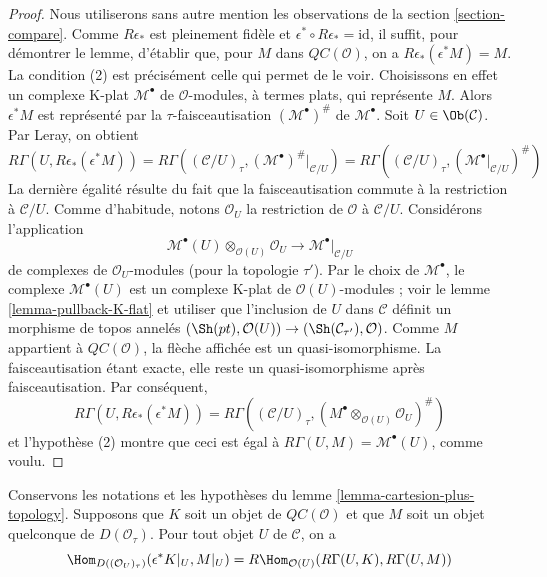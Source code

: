 \begin{proof}
Nous utiliserons sans autre mention les observations de la section
\ref{section-compare}. Comme $R\epsilon_*$ est pleinement fidèle et
$\epsilon^* \circ R\epsilon_* = \text{id}$, il suffit, pour démontrer le
lemme, d'établir que, pour $M$ dans $\mathit{QC}(\mathcal{O})$, on a
$R\epsilon_*(\epsilon^*M) = M$. La
condition (2) est précisément celle qui permet de le voir. Choisissons en
effet un complexe K-plat $\mathcal{M}^\bullet$ de $\mathcal{O}$-modules, à
termes plats, qui représente $M$. Alors $\epsilon^*M$ est représenté par la
$\tau$-faisceautisation $(\mathcal{M}^\bullet)^\#$ de
$\mathcal{M}^\bullet$. Soit $U \in \Ob(\mathcal{C})$. Par Leray, on obtient
$$
R\Gamma(U, R\epsilon_*(\epsilon^*M)) =
R\Gamma((\mathcal{C}/U)_\tau, (\mathcal{M}^\bullet)^\#|_{\mathcal{C}/U}) =
R\Gamma((\mathcal{C}/U)_\tau, (\mathcal{M}^\bullet|_{\mathcal{C}/U})^\#)
$$
La dernière égalité résulte du fait que la faisceautisation commute à la
restriction à $\mathcal{C}/U$. Comme d'habitude, notons $\mathcal{O}_U$ la
restriction de $\mathcal{O}$ à $\mathcal{C}/U$. Considérons l'application
$$
\mathcal{M}^\bullet(U) \otimes_{\mathcal{O}(U)} \mathcal{O}_U
\longrightarrow
\mathcal{M}^\bullet|_{\mathcal{C}/U}
$$
de complexes de $\mathcal{O}_U$-modules (pour la topologie $\tau'$). Par le
choix de $\mathcal{M}^\bullet$, le complexe $\mathcal{M}^\bullet(U)$ est un
complexe K-plat de $\mathcal{O}(U)$-modules ; voir le lemme
\ref{lemma-pullback-K-flat} et utiliser que l'inclusion de $U$ dans
$\mathcal{C}$ définit un morphisme de topos annelés
$(\Sh(pt), \mathcal{O}(U)) \to (\Sh(\mathcal{C}_{\tau'}), \mathcal{O})$.
Comme $M$ appartient à $\mathit{QC}(\mathcal{O})$, la flèche affichée est un
quasi-isomorphisme. La faisceautisation étant exacte, elle reste un
quasi-isomorphisme après faisceautisation. Par conséquent,
$$
R\Gamma(U, R\epsilon_*(\epsilon^*M)) =
R\Gamma((\mathcal{C}/U)_\tau,
(M^\bullet \otimes_{\mathcal{O}(U)} \mathcal{O}_U)^\#)
$$
et l'hypothèse (2) montre que ceci est égal à
$R\Gamma(U, M) = \mathcal{M}^\bullet(U)$, comme voulu.
\end{proof}

\begin{lemma}
\label{lemma-QC-hom-out-of-plus-topology}
Conservons les notations et les hypothèses du lemme
\ref{lemma-cartesion-plus-topology}. Supposons que $K$ soit un objet de
$\mathit{QC}(\mathcal{O})$ et que $M$ soit un objet quelconque de
$D(\mathcal{O}_\tau)$. Pour tout objet $U$ de $\mathcal{C}$, on a
$$
\Hom_{D((\mathcal{O}_U)_\tau)}(\epsilon^*K|_U, M|_U) =
R\Hom_{\mathcal{O}(U)}(R\Gamma(U, K), R\Gamma(U, M))
$$
\end{lemma}

